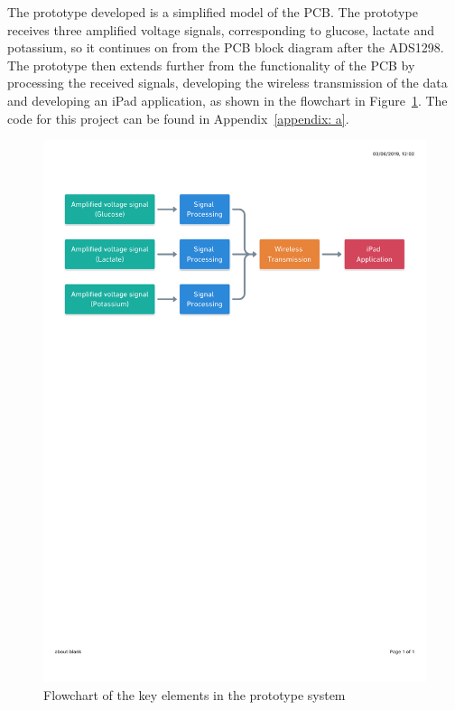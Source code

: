 The prototype developed is a simplified model of the PCB. The prototype receives three amplified voltage signals, corresponding to glucose, lactate and potassium, so it continues on from the PCB block diagram after the ADS1298. The prototype then extends further from the functionality of the PCB by processing the received signals, developing the wireless transmission of the data and developing an iPad application, as shown in the flowchart in Figure~\ref{fig: flowchart}. The code for this project can be found in Appendix~\ref{appendix: a}.

\begin{figure}[H]
\centering
\includegraphics[trim={0cm 19.5cm 0.5cm  2.5cm}, clip, width=1\textwidth]{./figures/Flowchart.pdf}
\captionsetup{justification=centering}
\caption{Flowchart of the key elements in the prototype system}
\label{fig: flowchart}
\end{figure}



